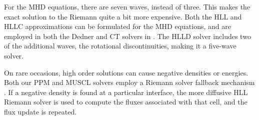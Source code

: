 For the MHD equations, there are seven waves, instead of three.  This makes the
exact solution to the Riemann quite a bit more expensive.  Both the HLL and HLLC
approximations can be formulated for the MHD equations, and are employed in both
the Dedner and CT solvers in \enzo.  The HLLD
solver includes two of the additional waves, the rotational discontinuities,
making it a five-wave solver.

On rare occasions, high order solutions can cause negative densities or energies.  
Both our PPM and MUSCL solvers employ a Riemann
solver fallback mechanism \citep{Lemaster09}.  If a negative density is found at
a particular interface, the more diffusive HLL Riemann solver is used to compute the fluxes associated with that cell, and the flux update is repeated.



